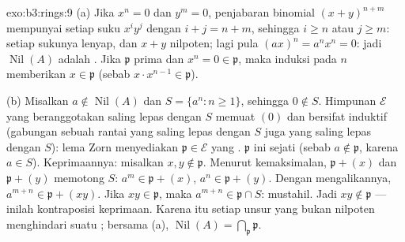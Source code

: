 \begin{solution}{exo:b3:rings:9}
(a) Jika $x^n = 0$ dan $y^m = 0$, penjabaran binomial
$(x+y)^{n+m}$ mempunyai setiap suku $x^iy^j$ dengan $i + j = n + m$, sehingga $i
\geq n$ atau $j \geq m$: setiap sukunya lenyap, dan $x + y$
nilpoten; lagi pula $(ax)^n = a^nx^n = 0$: jadi $\operatorname{Nil}(A)$ adalah
. Jika $\mathfrak p$ prima dan $x^n = 0 \in \mathfrak p$, maka
induksi pada $n$ memberikan $x \in \mathfrak p$ (sebab $x \cdot x^{n-1} \in
\mathfrak p$).

(b) Misalkan $a \notin \operatorname{Nil}(A)$ dan $S = \{a^n : n \geq
1\}$, sehingga $0 \notin S$. Himpunan $\mathcal E$ yang beranggotakan  saling lepas
dengan $S$ memuat $(0)$ dan bersifat induktif (gabungan sebuah rantai
 yang saling lepas dengan $S$ juga  yang saling lepas dengan $S$): lema Zorn
menyediakan $\mathfrak p \in \mathcal E$ yang .  $\mathfrak p$ ini
sejati (sebab $a \notin \mathfrak p$, karena $a \in S$). Keprimaannya: misalkan
$x, y \notin \mathfrak p$. Menurut kemaksimalan, $\mathfrak p + (x)$ dan
$\mathfrak p + (y)$ memotong $S$: $a^m \in \mathfrak p + (x)$, $a^n
\in \mathfrak p + (y)$. Dengan mengalikannya, $a^{m+n} \in \mathfrak p +
(xy)$. Jika $xy \in \mathfrak p$, maka $a^{m+n} \in \mathfrak p \cap
S$: mustahil. Jadi $xy \notin \mathfrak p$ --- inilah kontraposisi
keprimaan. Karena itu setiap unsur yang bukan nilpoten menghindari suatu ; bersama (a),
$\operatorname{Nil}(A) = \bigcap_{\mathfrak p} \mathfrak p$.
\end{solution}

